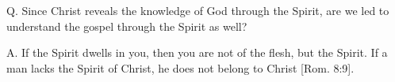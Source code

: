 \documentclass[../main.tex]{subfiles}
\begin{document}
	

	\section*{}
	Q. Since Christ reveals the knowledge of God through the Spirit, are we led to understand the gospel through the Spirit as well?
	
	A. If the Spirit dwells in you, then you are not of the flesh, but the Spirit. If a man lacks the Spirit of Christ, he does not belong to Christ [Rom. 8:9]. 
\end{document}

